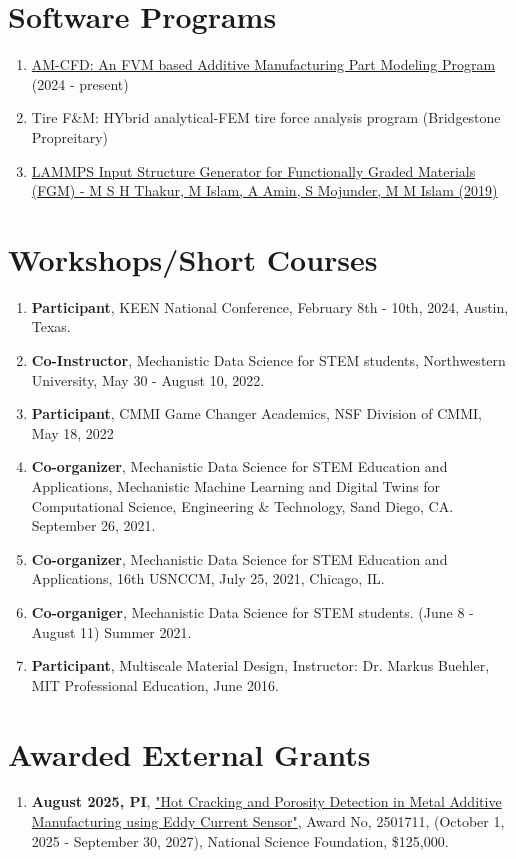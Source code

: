 \documentclass[11pt, letterpaper]{article}
\begin{document}
\section{Software Programs}
    \begin{enumerate}[label=\arabic*., itemsep=-1pt, topsep=2pt]
        \item \href{https://github.com/neoceph/AM-CFD}{AM-CFD: An FVM based Additive Manufacturing Part Modeling Program} (2024 - present) 
        \item Tire F\&M: HYbrid analytical-FEM tire force analysis program (Bridgestone Propreitary)
        \item \href{https://nanohub.org/resources/fgmbuilder}{LAMMPS Input Structure Generator for Functionally Graded Materials (FGM) - M S H Thakur, M Islam, A Amin, S Mojunder, M M Islam (2019)}
    \end{enumerate}

\section{Workshops/Short Courses}
    \begin{enumerate}[label=\arabic*., itemsep=-1pt, topsep=2pt]
        \item \textbf{Participant}, KEEN National Conference,  February 8th - 10th, 2024, Austin, Texas.
        \item \textbf{Co-Instructor}, Mechanistic Data Science for STEM students, Northwestern University, May 30 - August 10, 2022.
        \item \textbf{Participant}, CMMI Game Changer Academics, NSF Division of CMMI, May 18, 2022
        \item \textbf{Co-organizer}, Mechanistic Data Science for STEM Education and Applications, Mechanistic Machine Learning and Digital Twins for Computational Science, Engineering \& Technology, Sand Diego, CA. September 26, 2021.
        \item \textbf{Co-organizer}, Mechanistic Data Science for STEM Education and Applications, 16th USNCCM, July 25, 2021, Chicago, IL.
        \item \textbf{Co-organiger}, Mechanistic Data Science for STEM students. (June 8 - August 11) Summer 2021. 
        \item \textbf{Participant}, Multiscale Material Design, Instructor: Dr. Markus Buehler, MIT Professional Education, June 2016.
    \end{enumerate}

\section{Awarded External Grants}
    \begin{enumerate}[label=\arabic*., itemsep=-1pt, topsep=2pt]
        \item \textbf{August 2025, PI}, \href{https://www.nsf.gov/awardsearch/show-award?AWD_ID=2501711}{"Hot Cracking and Porosity Detection in Metal Additive Manufacturing using Eddy Current Sensor"}, Award No, 2501711, (October 1, 2025 - September 30, 2027), National Science Foundation, \$125,000.
    \end{enumerate}
\end{document}
